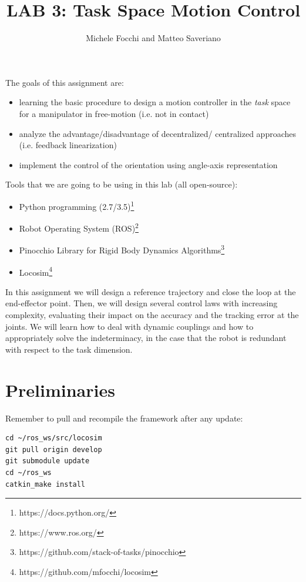 \documentclass[11pt]{article}
\title{LAB 3: Task Space Motion Control}
\author{Michele Focchi and Matteo Saveriano}
\date{}
\begin{document}
	\maketitle
	\noindent
	The goals of this assignment are:
	\begin{itemize}
		\item learning the basic procedure to design a motion controller in the \textit{task} space for a manipulator in free-motion (i.e. not in contact)
		\item analyze the advantage/disadvantage of decentralized/ centralized approaches (i.e. feedback linearization)
		\item implement the control of the orientation using angle-axis representation
	\end{itemize}
	
	\noindent
	Tools that we are going to be using in this lab (all open-source):
	\begin{itemize}
		\item Python programming (2.7/3.5)\footnote{https://docs.python.org/}
		\item Robot Operating System (ROS)\footnote{https://www.ros.org/}
		\item Pinocchio Library for Rigid Body Dynamics Algorithms\footnote{https://github.com/stack-of-tasks/pinocchio}
		\item Locosim\footnote{https://github.com/mfocchi/locosim}
	\end{itemize}
	In this assignment we will design a reference trajectory and close the loop at the end-effector point. 
	Then, we will design several control laws with increasing complexity, 
	evaluating their impact on the accuracy and the tracking error at the joints.
	We will learn how to deal with dynamic 
	couplings and how to appropriately solve the indeterminacy, in the case that the  
	robot is redundant with respect to the task dimension. 
	
\section{Preliminaries}
Remember to pull and recompile the framework after any update:

\begin{verbatim}
cd ~/ros_ws/src/locosim
git pull origin develop 
git submodule update
cd ~/ros_ws
catkin_make install
\end{verbatim}
\end{document}
